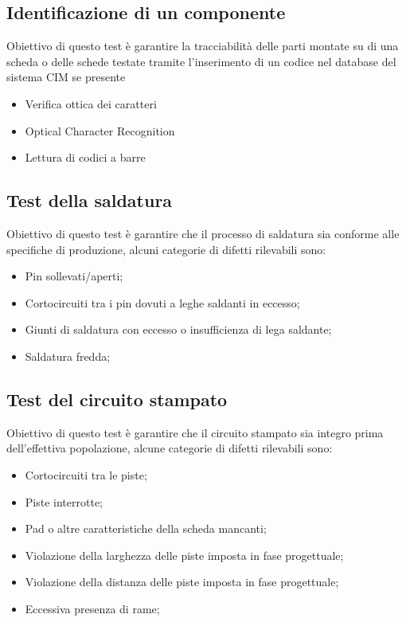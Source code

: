 \subsection{Identificazione di un componente}
Obiettivo di questo test è garantire la tracciabilità delle parti montate su di una scheda o delle schede
testate tramite l’inserimento di un codice nel database del sistema CIM se presente
\begin{itemize}
\item Verifica ottica dei caratteri
\item Optical Character Recognition
\item Lettura di codici a barre
\end{itemize}

\subsection{Test della saldatura}
Obiettivo di questo test è garantire che il processo di saldatura sia conforme alle specifiche di produzione,
alcuni categorie di difetti rilevabili sono:
\begin{itemize}
\item Pin sollevati/aperti;
\item Cortocircuiti tra i pin dovuti a leghe saldanti in eccesso;
\item Giunti di saldatura con eccesso o insufficienza di lega saldante;
\item Saldatura fredda;
\end{itemize}

\subsection{Test del circuito stampato}
Obiettivo di questo test è garantire che il circuito stampato sia integro prima dell’effettiva popolazione,
alcune categorie di difetti rilevabili sono:
\begin{itemize}
\item Cortocircuiti tra le piste;
\item Piste interrotte;
\item Pad o altre caratteristiche della scheda mancanti;
\item Violazione della larghezza delle piste imposta in fase progettuale;
\item Violazione della distanza delle piste imposta in fase progettuale;
\item Eccessiva presenza di rame;
\end{itemize}

